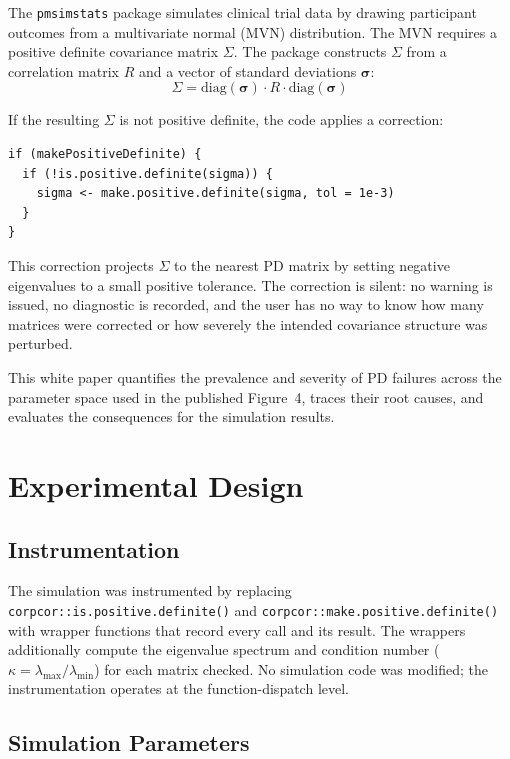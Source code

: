 \documentclass[11pt]{article}
\begin{document}
The \texttt{pmsimstats} package simulates clinical trial data by
drawing participant outcomes from a multivariate normal (MVN)
distribution. The MVN requires a positive definite covariance
matrix $\Sigma$. The package constructs $\Sigma$ from a
correlation matrix $R$ and a vector of standard deviations
$\boldsymbol{\sigma}$:
\[
\Sigma = \text{diag}(\boldsymbol{\sigma})
  \cdot R \cdot
  \text{diag}(\boldsymbol{\sigma})
\]

If the resulting $\Sigma$ is not positive definite, the code
applies a correction:

\begin{verbatim}
if (makePositiveDefinite) {
  if (!is.positive.definite(sigma)) {
    sigma <- make.positive.definite(sigma, tol = 1e-3)
  }
}
\end{verbatim}

This correction projects $\Sigma$ to the nearest PD matrix by
setting negative eigenvalues to a small positive tolerance. The
correction is silent: no warning is issued, no diagnostic is
recorded, and the user has no way to know how many matrices
were corrected or how severely the intended covariance structure
was perturbed.

This white paper quantifies the prevalence and severity of PD
failures across the parameter space used in the published
Figure~4, traces their root causes, and evaluates the
consequences for the simulation results.

\section{Experimental Design}

\subsection{Instrumentation}

The simulation was instrumented by replacing
\texttt{corpcor::is.positive.definite()} and
\texttt{corpcor::make.positive.definite()} with wrapper
functions that record every call and its result. The wrappers
additionally compute the eigenvalue spectrum and condition
number ($\kappa = \lambda_{\max} / \lambda_{\min}$) for each
matrix checked. No simulation code was modified; the
instrumentation operates at the function-dispatch level.

\subsection{Simulation Parameters}
\end{document}
